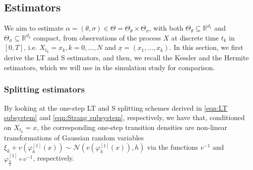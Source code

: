 \documentclass[a4paper,12pt]{article}
\numberwithin{equation}{section}
\theoremstyle{plain}
\theoremstyle{definition}
\begin{document}
\subsection{Estimators}
We aim to estimate $\alpha=(\theta,\sigma)\in \Theta=\Theta_{\theta}\times\Theta_{\sigma}$, with both $\Theta_{\theta}\subseteq\mathbb{R}^{d_1}$ and $\Theta_{\sigma}\subseteq\mathbb{R}^{d_2}$  compact, from observations of the process $X$ at discrete time $t_k$ in $[0,T]$, i.e. $X_{t_k}=x_k, k=0,\ldots, N$ and $\underline{x}=(x_1,\ldots, x_k)$. In this section, we first derive the LT and S estimators, and then, we recall the Kessler and the Hermite estimators, which we will use in the simulation study for comparison.

\subsubsection{Splitting estimators}
By looking at the one-step LT and S splitting schemes derived in
\eqref{eqn:LT subsystem} and \eqref{eqn:Strang subsystem}, respectively, we have that, conditioned on $X_{t_k}=x$, the corresponding one-step transition densities are non-linear transformations of  Gaussian random variables  $\xi_k+v(\varphi^{[1]}_{h}(x))\sim \mathcal{N}(v(\varphi^{[1]}_{ h}(x)),h)$ via the functions $v^{-1}$ and $\varphi_{\frac{h}{2}}^{[1]}\circ v^{-1}$, respectively.
\end{document}
